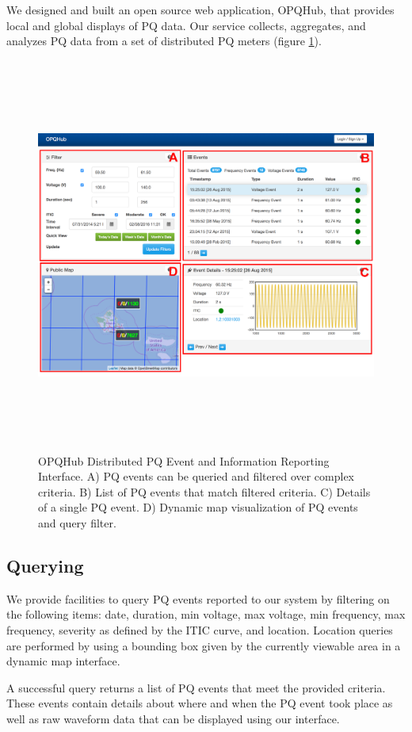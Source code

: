 We designed and built an open source web application, OPQHub, that provides local and global displays of PQ data. Our service collects, aggregates, and analyzes PQ data from a set of distributed PQ meters (figure \ref{fig:opqhub}).

\begin{figure}
  \includegraphics[width=\textwidth,height=13cm]{img/opqhub.png}
  \caption{OPQHub Distributed PQ Event and Information Reporting Interface. A) PQ events can be queried and filtered over complex criteria. B) List of PQ events that match filtered criteria. C) Details of a single PQ event. D) Dynamic map visualization of PQ events and query filter.}
  \label{fig:opqhub}
\end{figure}

\subsection{Querying}
We provide facilities to query PQ events reported to our system by filtering on the following items: date, duration, min voltage, max voltage, min frequency, max frequency, severity as defined by the ITIC curve\cite{m:ITIC}, and location. Location queries are performed by using a bounding box given by the currently viewable area in a dynamic map interface.

A successful query returns a list of PQ events that meet the provided criteria. These events contain details about where and when the PQ event took place as well as raw waveform data that can be displayed using our interface.

